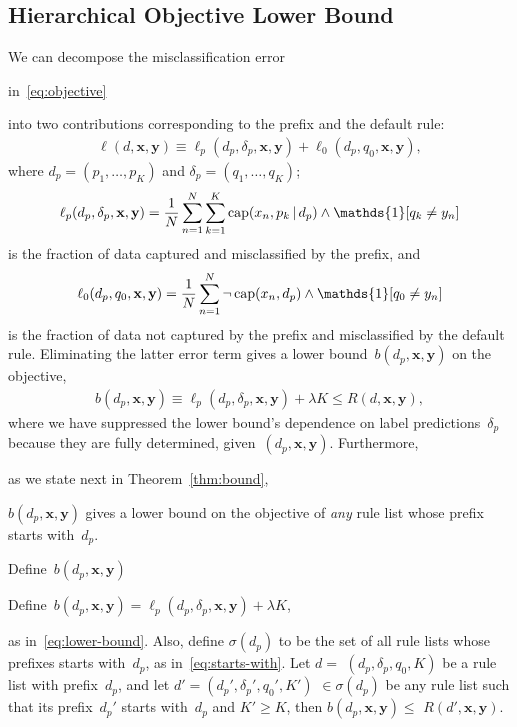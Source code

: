 \documentclass[twoside,11pt]{article}
\def\one{\mathds{1}}
\newcommand{\x}{\mathbf{x}}
\newcommand{\y}{\mathbf{y}}
\def\RL{{d}}
\def\Prefix{d_p}
\def\Labels{\delta_p}
\def\Default{q_0}
\def\Obj{R}
\def\Loss{\ell}
\def\Reg{{\lambda}}
\def\Cap{\textnormal{cap}}
\def\StartsWith{\sigma}
\def\one{\mathds{1}}
\newcommand{\given}{\,|\,}
\begin{document}
\subsection{Hierarchical Objective Lower Bound}
\label{sec:hierarchical}

We can decompose the misclassification error
\begin{arxiv}
in~\eqref{eq:objective}
\end{arxiv}
into two contributions corresponding to the prefix and the default rule:
\begin{align*}
\Loss(\RL, \x, \y) %
\equiv \Loss_p(\Prefix, \Labels, \x, \y) + \Loss_0(\Prefix, \Default, \x, \y),
\end{align*}
where ${\Prefix = (p_1, \dots, p_K)}$ and ${\Labels = (q_1, \dots, q_K)}$;
\begin{align*}
\Loss_p(\Prefix, \Labels, \x, \y) =
\frac{1}{N} \sum_{n=1}^N \sum_{k=1}^K \Cap(x_n, p_k \given \Prefix) \wedge \one [ q_k \neq y_n ]
\end{align*}
is the fraction of data captured and misclassified by the prefix, and
\begin{align*}
\Loss_0(\Prefix, \Default, \x, \y) =
\frac{1}{N} \sum_{n=1}^N \neg\, \Cap(x_n, \Prefix) \wedge \one [ \Default \neq y_n ]
\end{align*}
is the fraction of data not captured by the prefix and misclassified by the default rule.
%
Eliminating the latter error term gives a lower bound~$b(\Prefix, \x, \y)$ on the objective,
\begin{align}
b(\Prefix, \x, \y) \equiv \Loss_p(\Prefix, \Labels, \x, \y) + \Reg K \le \Obj(\RL, \x, \y),
\label{eq:lower-bound}
\end{align}
where we have suppressed the lower bound's dependence on label predictions~$\Labels$
because they are fully determined, given~${(\Prefix, \x, \y)}$.
%
Furthermore,
\begin{arxiv}
as we state next in Theorem~\ref{thm:bound},
\end{arxiv}
$b(\Prefix, \x, \y)$ gives a lower bound on the objective of
\emph{any} rule list whose prefix starts with~$\Prefix$.

\begin{theorem}
\begin{arxiv}
Define~${b(\Prefix, \x, \y)}$
\end{arxiv}
\begin{kdd}
Define~${b(\Prefix, \x, \y) = \Loss_p(\Prefix, \Labels, \x, \y) + \Reg K}$,
\end{kdd}
as in~\eqref{eq:lower-bound}.
%
Also, define $\StartsWith(\Prefix)$ to be the set of all rule lists
whose prefixes starts with~$\Prefix$, as in~\eqref{eq:starts-with}.
%
Let ${\RL = }$ ${(\Prefix, \Labels, \Default, K)}$ be a rule list
with prefix~$\Prefix$, and let
${\RL' = (\Prefix', \Labels', \Default', K')}$ $\in \StartsWith(\Prefix)$
be any rule list such that its prefix~$\Prefix'$ starts with~$\Prefix$
and ${K' \ge K}$, then ${b(\Prefix, \x, \y) \le}$ ${\Obj(\RL', \x, \y)}$.
\label{thm:bound}
\end{theorem}
\end{document}
